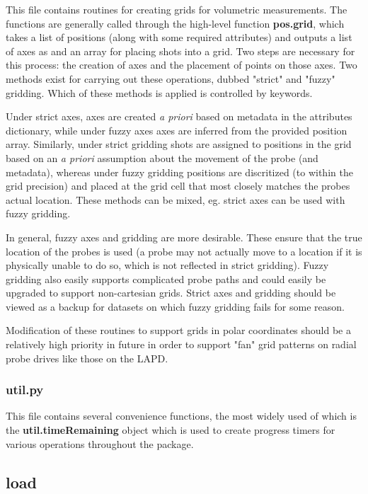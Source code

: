 \documentclass[12pt]{article}
\newcommand{\loc}[1]{{\bf \fontfamily{pcr}\selectfont #1}}
\newcommand{\todo}[1]{ \begin{tcolorbox} \centering  #1 \end{tcolorbox}}
\begin{document}
This file contains routines for creating grids for volumetric measurements. The functions are generally called through the high-level function \loc{pos.grid}, which takes a list of positions (along with some required attributes) and outputs a list of axes as and an array for placing shots into a grid. Two steps are necessary for this process: the creation of axes and the placement of points on those axes. Two methods exist for carrying out these operations, dubbed "strict" and "fuzzy" gridding. Which of these methods is applied is controlled by keywords.

Under strict axes, axes are created \textit{a priori} based on metadata in the attributes dictionary, while under fuzzy axes axes are inferred from the provided position array. Similarly, under strict gridding shots are assigned to positions in the grid based on an \textit{a priori} assumption about the movement of the probe (and metadata), whereas under fuzzy gridding positions are discritized (to within the grid precision) and placed at the grid cell that most closely matches the probes actual location. These methods can be mixed, eg. strict axes can be used with fuzzy gridding. 

In general, fuzzy axes and gridding are more desirable. These ensure that the true location of the probes is used (a probe may not actually move to a location if it is physically unable to do so, which is not reflected in strict gridding). Fuzzy gridding also easily supports complicated probe paths and could easily be upgraded to support non-cartesian grids. Strict axes and gridding should be viewed as a backup for datasets on which fuzzy gridding fails for some reason.

\todo{Modification of these routines to support grids in polar coordinates should be a relatively high priority in future in order to support "fan" grid patterns on radial probe drives like those on the LAPD.}


\subsubsection{\loc{util.py}}

This file contains several convenience functions, the most widely used of which is the \loc{util.timeRemaining} object which is used to create progress timers for various operations throughout the package.

\subsection{\loc{load}}
\end{document}

